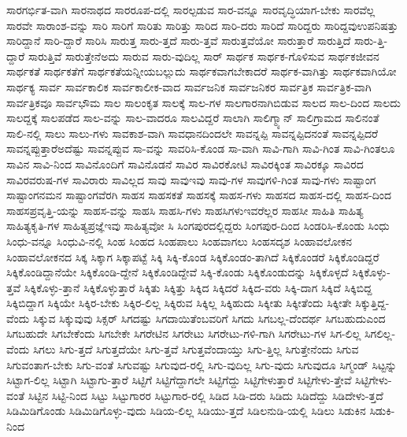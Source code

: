 {ಸಾರಗರ್ಭಿತ-ವಾಗಿ
ಸಾರನಾಥದ
ಸಾರರೂಪ-ದಲ್ಲಿ
ಸಾರಲ್ಪಡುವ
ಸಾರ-ವನ್ನೂ
ಸಾರವೃದ್ಧಿಯಾಗ-ಬೇಕು
ಸಾರವೆಲ್ಲ
ಸಾರವೇ
ಸಾರಾಂಶ-ವನ್ನು
ಸಾರಿ
ಸಾರಿಗೆ
ಸಾರಿತು
ಸಾರಿತ್ತು
ಸಾರಿದ
ಸಾರಿ-ದರು
ಸಾರಿದೆ
ಸಾರಿದ್ದರು
ಸಾರಿದ್ದವುಉಪನಿಷತ್ತು
ಸಾರಿದ್ದಾನೆ
ಸಾರಿ-ದ್ದಾರೆ
ಸಾರಿಸಿ
ಸಾರುತ್ತ
ಸಾರು-ತ್ತದೆ
ಸಾರು-ತ್ತವೆ
ಸಾರುತ್ತವೆಯೋ
ಸಾರುತ್ತಾರೆ
ಸಾರುತ್ತಿದೆ
ಸಾರು-ತ್ತಿ-ದ್ದಾರೆ
ಸಾರುತ್ತಿವೆ
ಸಾರುತ್ತೇನೆಅದು
ಸಾರುವ
ಸಾರು-ವುದಿಲ್ಲ
ಸಾರ್
ಸಾರ್ಥಕ
ಸಾರ್ಥಕ-ಗೊಳಿಸುವ
ಸಾರ್ಥಕಜೀವನ
ಸಾರ್ಥಕತೆ
ಸಾರ್ಥಕತೆಗೆ
ಸಾರ್ಥಕತೆಯನ್ನೀಯಬಲ್ಲುದು
ಸಾರ್ಥಕವಾಗಬೇಕಾದರೆ
ಸಾರ್ಥಕ-ವಾಗಿತ್ತು
ಸಾರ್ಥಕವಾಗಿಯೋ
ಸಾರ್ಥಕ್ಯ
ಸಾರ್ವ
ಸಾರ್ವಕಾಲಿಕ
ಸಾರ್ವಕಾಲೀಕ-ವಾದ
ಸಾರ್ವಜನಿಕ
ಸಾರ್ವಜನಿಕರ
ಸಾರ್ವತ್ರಿಕ
ಸಾರ್ವತ್ರಿಕ-ವಾಗಿ
ಸಾರ್ವತ್ರಿಕವೂ
ಸಾರ್ವಭೌಮ
ಸಾಲ
ಸಾಲಂಕೃತ
ಸಾಲಕ್ಕೆ
ಸಾಲ-ಗಳ
ಸಾಲಗಾರನಾಗಿಬಿಡುವ
ಸಾಲದ
ಸಾಲ-ದಿಂದ
ಸಾಲದು
ಸಾಲದ್ದಕ್ಕೆ
ಸಾಲಪಡೆದ
ಸಾಲ-ವನ್ನು
ಸಾಲ-ವಾದರೂ
ಸಾಲವಿದ್ದರೆ
ಸಾಲಾಗಿ
ಸಾಲಿಗ್ಮ್ಯಾನ್
ಸಾಲಿಗ್ರಾಮದ
ಸಾಲಿನಂತೆ
ಸಾಲಿ-ನಲ್ಲಿ
ಸಾಲು
ಸಾಲು-ಗಳು
ಸಾವಕಾಶ-ವಾಗಿ
ಸಾವಧಾನದಿಂದಲೇ
ಸಾವನ್ನಪ್ಪಿ
ಸಾವನ್ನಪ್ಪಿದನಂತೆ
ಸಾವನ್ನಪ್ಪಿದರೆ
ಸಾವನ್ನಪ್ಪುತ್ತಾರೆಅದೆಷ್ಟು
ಸಾವನ್ನಪ್ಪುವ
ಸಾ-ವನ್ನು
ಸಾವರಿಸಿ-ಕೊಂಡ
ಸಾ-ವಾಗಿ
ಸಾವಿ-ಗಾಗಿ
ಸಾವಿ-ಗಿಂತ
ಸಾವಿ-ಗಿಂತಲೂ
ಸಾವಿನ
ಸಾವಿ-ನಿಂದ
ಸಾವಿನೊಂದಿಗೆ
ಸಾವಿನೊಡನೆ
ಸಾವಿರ
ಸಾವಿರಕೋಟಿ
ಸಾವಿರಕ್ಕಿಂತ
ಸಾವಿರಕ್ಕೂ
ಸಾವಿರದ
ಸಾವಿರವರುಷ-ಗಳ
ಸಾವಿರಾರು
ಸಾವಿಲ್ಲದ
ಸಾವು
ಸಾವುಇವು
ಸಾವು-ಗಳ
ಸಾವುಗಳಿ-ಗಿಂತ
ಸಾವು-ಗಳು
ಸಾಷ್ಟಾಂಗ
ಸಾಷ್ಟಾಂಗನಮನ
ಸಾಷ್ಟಾಂಗವೆರಗಿ
ಸಾಹಸ
ಸಾಹಸಕತೆ
ಸಾಹಸಕ್ಕೆ
ಸಾಹಸ-ಗಳು
ಸಾಹಸದ
ಸಾಹಸ-ದಲ್ಲಿ
ಸಾಹಸ-ದಿಂದ
ಸಾಹಸಪ್ರವೃತ್ತಿ-ಯನ್ನು
ಸಾಹಸ-ವನ್ನು
ಸಾಹಸಿ
ಸಾಹಸಿ-ಗಳು
ಸಾಹಸಿಗಳುಇವರೆಲ್ಲರ
ಸಾಹಸೀ
ಸಾಹಿತಿ
ಸಾಹಿತ್ಯ
ಸಾಹಿತ್ಯಕೃತಿ-ಗಳ
ಸಾಹಿತ್ಯಪ್ರಜ್ಞೆಇವು
ಸಾಹಿತ್ಯವೋ
ಸಿ
ಸಿಂಗಪುರದಲ್ಲಿದ್ದರು
ಸಿಂಗಪುರ-ದಿಂದ
ಸಿಂಡರಿಸಿ-ಕೊಂಡು
ಸಿಂಧು
ಸಿಂಧು-ವನ್ನೂ
ಸಿಂಧುವಿ-ನಲ್ಲಿ
ಸಿಂಹ
ಸಿಂಹದ
ಸಿಂಹಪಾಲು
ಸಿಂಹವಾಗಲು
ಸಿಂಹಸದೃಶ
ಸಿಂಹಾವಲೋಕನ
ಸಿಂಹಾವಲೋಕನದ
ಸಿಕ್ಕ
ಸಿಕ್ಕಾಗ
ಸಿಕ್ಕಾಪಟ್ಟೆ
ಸಿಕ್ಕಿ
ಸಿಕ್ಕಿ-ಕೊಂಡ
ಸಿಕ್ಕಿಕೊಂಡಂ-ತಾಗಿದೆ
ಸಿಕ್ಕಿಕೊಂಡರೆ
ಸಿಕ್ಕಿಕೊಂಡಿದ್ದರೆ
ಸಿಕ್ಕಿಕೊಂಡಿದ್ದಾನೆಯೇ
ಸಿಕ್ಕಿಕೊಂಡಿ-ದ್ದೇನೆ
ಸಿಕ್ಕಿಕೊಂಡಿದ್ದೇವೆ
ಸಿಕ್ಕಿ-ಕೊಂಡು
ಸಿಕ್ಕಿಕೊಂಡುದನ್ನು
ಸಿಕ್ಕಿಕೊಳ್ಳದೆ
ಸಿಕ್ಕಿಕೊಳ್ಳು-ತ್ತವೆ
ಸಿಕ್ಕಿಕೊಳ್ಳು-ತ್ತಾನೆ
ಸಿಕ್ಕಿಕೊಳ್ಳುತ್ತಾರೆ
ಸಿಕ್ಕಿತು
ಸಿಕ್ಕಿತ್ತು
ಸಿಕ್ಕಿದ
ಸಿಕ್ಕಿದರೆ
ಸಿಕ್ಕಿದ-ವರು
ಸಿಕ್ಕಿ-ದಾಗ
ಸಿಕ್ಕಿದೆ
ಸಿಕ್ಕಿಬಿದ್ದ
ಸಿಕ್ಕಿಬಿದ್ದಾಗ
ಸಿಕ್ಕಿಯೇ
ಸಿಕ್ಕಿರ-ಬೇಕು
ಸಿಕ್ಕಿರ-ಲಿಲ್ಲ
ಸಿಕ್ಕಿರುವ
ಸಿಕ್ಕಿಲ್ಲ
ಸಿಕ್ಕಿಹುದು
ಸಿಕ್ಕೀತು
ಸಿಕ್ಕೀತೆಂದು
ಸಿಕ್ಕೀತೇ
ಸಿಕ್ಕುತ್ತಿದ್ದ-ವೆಂದು
ಸಿಕ್ಕುವ
ಸಿಕ್ಕುವುವು
ಸಿಕ್ಸರ್
ಸಿಗದಷ್ಟು
ಸಿಗದಾಯಿತೆಂಬವರಿಗೆ
ಸಿಗದು
ಸಿಗಬಲ್ಲ-ದೆಂದರ್ಥ
ಸಿಗಬಹುದುಎಂದ
ಸಿಗಬಹುದೇ
ಸಿಗಬೇಕೆಂದು
ಸಿಗಬೇಕೇ
ಸಿಗರೇಟಿನ
ಸಿಗರೇಟು
ಸಿಗರೇಟು-ಗಳಿ-ಗಾಗಿ
ಸಿಗರೇಟು-ಗಳ
ಸಿಗ-ಲಿಲ್ಲ
ಸಿಗಲಿಲ್ಲ-ವೆಂದು
ಸಿಗಲು
ಸಿಗು-ತ್ತದೆ
ಸಿಗುತ್ತದೆಯೇ
ಸಿಗು-ತ್ತವೆ
ಸಿಗುತ್ತವೆಂದಾಯ್ತು
ಸಿಗು-ತ್ತಿಲ್ಲ
ಸಿಗುತ್ತೇನೆಂದು
ಸಿಗುವ
ಸಿಗುವಂತಾಗ-ಬೇಕು
ಸಿಗು-ವಂತೆ
ಸಿಗುವಷ್ಟು
ಸಿಗುವುದ-ರಲ್ಲಿ
ಸಿಗು-ವುದಿಲ್ಲ
ಸಿಗು-ವುದು
ಸಿಗುವುದೂ
ಸಿಗ್ಮಂಡ್
ಸಿಟ್ಟನ್ನು
ಸಿಟ್ಟಾಗ-ಲಿಲ್ಲ
ಸಿಟ್ಟಾಗಿ
ಸಿಟ್ಟಾಗು-ತ್ತಾರೆ
ಸಿಟ್ಟಿಗೆ
ಸಿಟ್ಟಿಗೆದ್ದಾಗಲೇ
ಸಿಟ್ಟಿಗೆದ್ದು
ಸಿಟ್ಟಿಗೇಳುತ್ತಾರೆ
ಸಿಟ್ಟಿಗೇಳು-ತ್ತೇವೆ
ಸಿಟ್ಟಿಗೇಳು-ವಂತೆ
ಸಿಟ್ಟಿನ
ಸಿಟ್ಟಿ-ನಿಂದ
ಸಿಟ್ಟು
ಸಿಟ್ಟುಗಾರರ
ಸಿಟ್ಟುಗಾರ-ರಲ್ಲಿ
ಸಿಡಿದ
ಸಿಡಿ-ದರು
ಸಿಡಿದು
ಸಿಡಿದೆದ್ದು
ಸಿಡಿದೇಳು-ತ್ತದೆ
ಸಿಡಿಮಿಡಿಗೊಂಡು
ಸಿಡಿಮಿಡಿಗೊಳ್ಳು-ವುದು
ಸಿಡಿಯ-ಲಿಲ್ಲ
ಸಿಡಿಯು-ತ್ತದೆ
ಸಿಡಿಲನುಡಿ-ಯಲ್ಲಿ
ಸಿಡಿಲು
ಸಿಡುಕಿನ
ಸಿಡುಕಿ-ನಿಂದ
}

